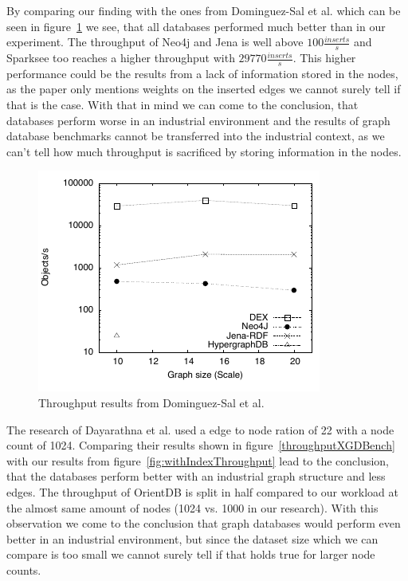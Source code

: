 By comparing our finding with the ones from Dominguez-Sal et al.\cite{TaoShen} which can be seen in figure~\ref{fig:throughputShen} we see,
that all databases performed much better than in our experiment.
The throughput of Neo4j and Jena is well above $ 100 \frac{inserts}{s} $ and Sparksee too reaches a higher throughput with $ 29770 \frac{inserts}{s} $.
This higher performance could be the results from a lack of information stored in the nodes,
as the paper only mentions weights on the inserted edges we cannot surely tell if that is the case.
With that in mind we can come to the conclusion,
that databases perform worse in an industrial environment and the results of graph database benchmarks cannot be transferred into the industrial context,
as we can't tell how much throughput is sacrificed by storing information in the nodes.

\begin{figure}[!h]
  \centering
  \includegraphics[width=.8\textwidth]{images/benchmarks/ShenResultsInsert}
  \caption{Throughput results from Dominguez-Sal et al.\cite{TaoShen}}
  \label{fig:throughputShen}
\end{figure}

The research of Dayarathna et al.\cite{Dayarathna2012} used a edge to node ration of 22 with a node count of 1024.
Comparing their results shown in figure~\ref{throughputXGDBench} with our results from figure~\ref{fig:withIndexThroughput} lead to the conclusion,
that the databases perform better with an industrial graph structure and less edges.
The throughput of OrientDB is split in half compared to our workload at the almost same amount of nodes (1024 vs. 1000 in our research).
With this observation we come to the conclusion that graph databases would perform even better in an industrial environment,
but since the dataset size which we can compare is too small we cannot surely tell if that holds true for larger node counts.

